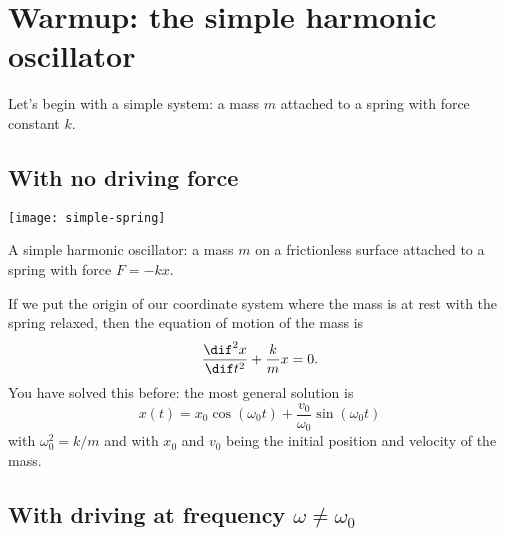 
\newcommand*{\DDtt}[1]{\frac{\dif^{2} #1}{\dif t^{2}}}
\newcommand*{\wt}{\omega t}
\newcommand*{\wot}{\omega_{0} t}
\newcommand*{\wmt}{\omega_{m} t}
\newcommand*{\womw}{(\omega_{0}^{2}-\omega^{2})}
\newcommand*{\gw}{\Gamma^{2}\omega^{2}}

\nocite{Mihalas1978Stellar-Atmosph,LeBlanc2010An-Introduction,Carroll2006An-Introduction}

\section{Warmup: the simple harmonic oscillator}

Let's begin with a simple system: a mass $m$ attached to a spring with force constant $k$. 

\subsection{With no driving force}

\begin{marginfigure}
\texttt{[image: simple-spring]}
\caption[A simple harmonic oscillator]{A simple harmonic oscillator: a mass $m$ on a frictionless surface attached to a  spring with force $F = -kx$.
\label{f.simple-spring}}
\end{marginfigure}

If we put the origin of our coordinate system where the mass is at rest with the spring relaxed, then the equation of motion of the mass is
\begin{equation}\label{e.SHO-basic}
	\DDtt{x} + \frac{k}{m} x = 0.
\end{equation}
You have solved this before: the most general solution is
\begin{equation}\label{e.SHO-general-solution}
	x(t) = x_{0}\cos(\wot) + \frac{v_{0}}{\omega_{0}}\sin(\wot)
\end{equation}
with $\omega_{0}^{2} = k/m$ and with $x_{0}$ and $v_{0}$ being the initial position and velocity of the mass.

\subsection{With driving at frequency $\omega \neq \omega_{0}$}

